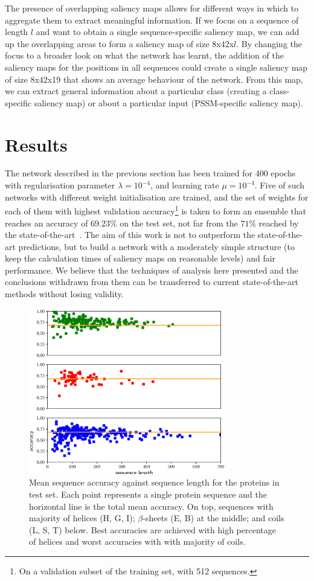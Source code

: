 \documentclass{article}
\begin{document}
The presence of overlapping saliency maps allows for different ways in which to aggregate them to extract meaningful information. If we focus on a sequence of length $l$ and want to obtain a single sequence-specific saliency map, we can add up the overlapping areas to form a saliency map of size 8x42x$l$. By changing the focus to a broader look on what the network has learnt, the addition of the saliency maps for the positions in all sequences could create a single saliency map of size 8x42x19 that shows an average behaviour of the network. From this map, we can extract general information about a particular class (creating a class-specific saliency map) or about a particular input (PSSM-specific saliency map).

\section{Results}
\label{sec:results}

The network described in the previous section has been trained for 400 epochs with regularisation parameter $\lambda=10^{-4}$, and learning rate $\mu=10^{-4}$. Five of such networks with different weight initialisation are trained, and the set of weights for each of them with highest validation accuracy\footnote{On a validation subset of the training set, with 512 sequences.} is taken to form an ensemble that reaches an accuracy of $69.23\%$ on the test set, not far from the $71\%$ reached by the state-of-the-art~\cite{Busia2017}. The aim of this work is not to outperform the state-of-the-art predictions, but to build a network with a moderately simple structure (to keep the calculation times of saliency maps on reasonable levels) and fair performance. We believe that the techniques of analysis here presented and the conclusions withdrawn from them can be transferred to current state-of-the-art methods without losing validity.
\begin{figure}[t]
	\centering
	\centerline{\includegraphics[width=8.6cm]{per_seq_acc}}
	\caption{Mean sequence accuracy against sequence length for the proteins in test set. Each point represents a single protein sequence and the horizontal line is the total mean accuracy. On top, sequences with majority of helices (H, G, I); $\beta$-sheets (E, B) at the middle; and coils (L, S, T) below. Best accuracies are achieved with high percentage of helices and worst accuracies with with majority of coils.}
	\label{fig:accuracies}
\end{figure}
\end{document}

